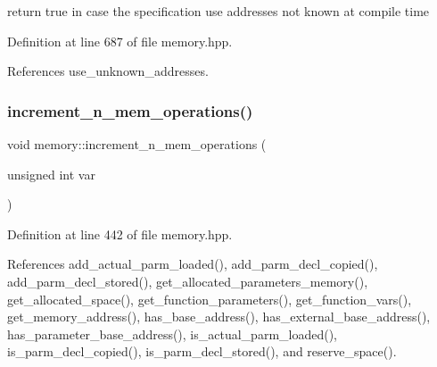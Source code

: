 return true in case the specification use addresses not known at compile time 



Definition at line 687 of file memory.\+hpp.



References use\+\_\+unknown\+\_\+addresses.

\mbox{\label{classmemory_a7115d45a81bee175e0e55a71ea92d3d9}} 
\subsubsection{\texorpdfstring{increment\+\_\+n\+\_\+mem\+\_\+operations()}{increment\_n\_mem\_operations()}}
{\footnotesize\ttfamily void memory\+::increment\+\_\+n\+\_\+mem\+\_\+operations (\begin{DoxyParamCaption}\item[{unsigned int}]{var }\end{DoxyParamCaption})\hspace{0.3cm}{\ttfamily [inline]}}



Definition at line 442 of file memory.\+hpp.



References add\+\_\+actual\+\_\+parm\+\_\+loaded(), add\+\_\+parm\+\_\+decl\+\_\+copied(), add\+\_\+parm\+\_\+decl\+\_\+stored(), get\+\_\+allocated\+\_\+parameters\+\_\+memory(), get\+\_\+allocated\+\_\+space(), get\+\_\+function\+\_\+parameters(), get\+\_\+function\+\_\+vars(), get\+\_\+memory\+\_\+address(), has\+\_\+base\+\_\+address(), has\+\_\+external\+\_\+base\+\_\+address(), has\+\_\+parameter\+\_\+base\+\_\+address(), is\+\_\+actual\+\_\+parm\+\_\+loaded(), is\+\_\+parm\+\_\+decl\+\_\+copied(), is\+\_\+parm\+\_\+decl\+\_\+stored(), and reserve\+\_\+space().


